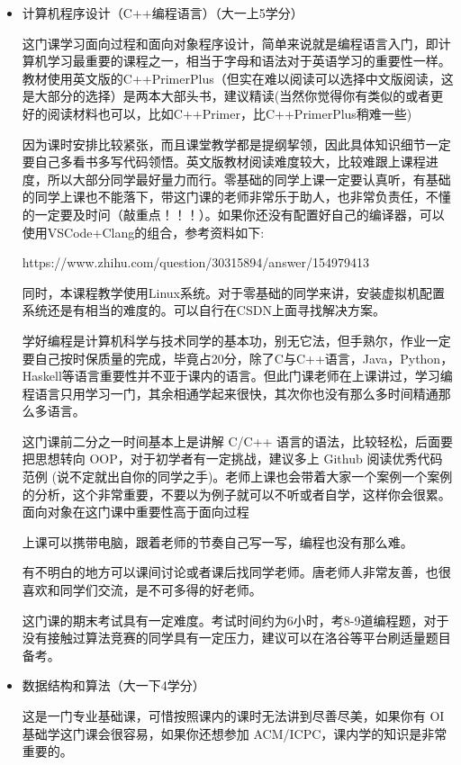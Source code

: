 \documentclass[
decoration,  %
]{qyxf-book}
\begin{document}
\begin{itemize}
	\item 计算机程序设计（C++编程语言）（大一上5学分） 
	\par 
	这门课学习面向过程和面向对象程序设计，简单来说就是编程语言入门，即计算机学习最重要的课程之一，相当于字母和语法对于英语学习的重要性一样。教材使用英文版的C++PrimerPlus（但实在难以阅读可以选择中文版阅读，这是大部分的选择）是两本大部头书，建议精读(当然你觉得你有类似的或者更好的阅读材料也可以，比如C++Primer，比C++PrimerPlus稍难一些) 	
	
	因为课时安排比较紧张，而且课堂教学都是提纲挈领，因此具体知识细节一定要自己多看书多写代码领悟。英文版教材阅读难度较大，比较难跟上课程进度，所以大部分同学最好量力而行。零基础的同学上课一定要认真听，有基础的同学上课也不能落下，带这门课的老师非常乐于助人，也非常负责任，不懂的一定要及时问（敲重点！！！）。如果你还没有配置好自己的编译器，可以使用VSCode+Clang的组合，参考资料如下:	
	
	https://www.zhihu.com/question/30315894/answer/154979413
	
	
	同时，本课程教学使用Linux系统。对于零基础的同学来讲，安装虚拟机配置系统还是有相当的难度的。可以自行在CSDN上面寻找解决方案。
	
	学好编程是计算机科学与技术同学的基本功，别无它法，但手熟尔，作业一定要自己按时保质量的完成，毕竟占20分，除了C与C++语言，Java，Python，Haskell等语言重要性并不亚于课内的语言。但此门课老师在上课讲过，学习编程语言只用学习一门，其余相通学起来很快，其次你也没有那么多时间精通那么多语言。
	
	这门课前二分之一时间基本上是讲解 C/C++ 语言的语法，比较轻松，后面要把思想转向 OOP，对于初学者有一定挑战，建议多上 Github 阅读优秀代码范例 (说不定就出自你的同学之手)。老师上课也会带着大家一个案例一个案例的分析，这个非常重要，不要以为例子就可以不听或者自学，这样你会很累。面向对象在这门课中重要性高于面向过程
	
	上课可以携带电脑，跟着老师的节奏自己写一写，编程也没有那么难。

	有不明白的地方可以课间讨论或者课后找同学老师。唐老师人非常友善，也很喜欢和同学们交流，是不可多得的好老师。

	这门课的期末考试具有一定难度。考试时间约为6小时，考8-9道编程题，对于没有接触过算法竞赛的同学具有一定压力，建议可以在洛谷等平台刷适量题目备考。
	
	\item 数据结构和算法（大一下4学分） 
	\par 
	这是一门专业基础课，可惜按照课内的课时无法讲到尽善尽美，如果你有 OI 基础学这门课会很容易，如果你还想参加 ACM/ICPC，课内学的知识是非常重要的。
	

\end{itemize}
\end{document}
